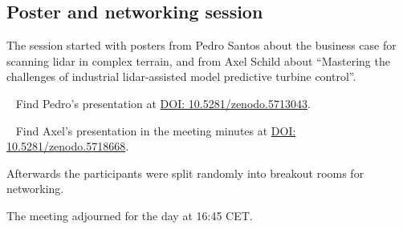 \subsection{Poster and networking session}

The session started with posters from Pedro Santos about the business case for scanning lidar in complex terrain, and from Axel Schild about ``Mastering the challenges of industrial lidar-assisted model predictive turbine control''. 

\faFilePowerpointO ~ Find Pedro's presentation at \href{https://doi.org/10.5281/zenodo.5713043}{DOI: 10.5281/zenodo.5713043}.

\faFilePowerpointO ~ Find Axel's presentation in the meeting minutes at \href{https://doi.org/10.5281/zenodo.5718668}{DOI: 10.5281/zenodo.5718668}.

Afterwards the participants were split randomly into breakout rooms for networking.

The meeting adjourned for the day at 16:45 CET.